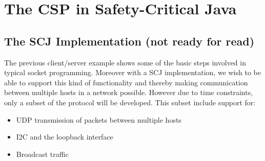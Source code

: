 \chapter{The CSP in Safety-Critical Java}
\label{chapter:cspinscj}

\section{The SCJ Implementation (not ready for read)}
The previous client/server example shows some of the basic steps involved in typical socket programming. Moreover with a SCJ implementation, we wish to be able to support this kind of functionality and thereby making communication between multiple hosts in a network possible. However due to time constraints, only a subset of the protocol will be developed. This subset include support for:

\begin{itemize}
	\item UDP transmission of packets between multiple hosts
	\item I2C and the loopback interface
	\item Broadcast traffic
\end{itemize}